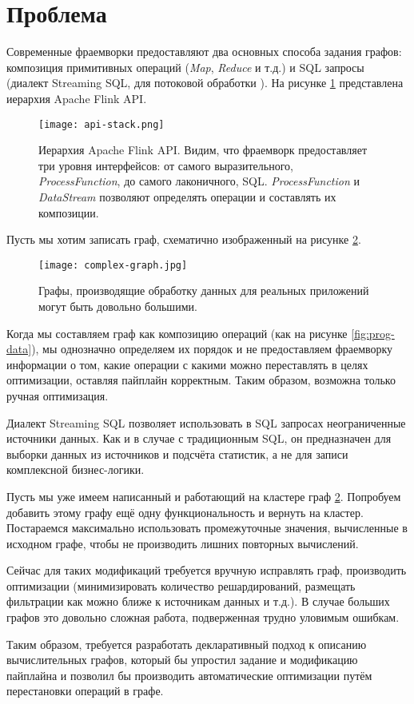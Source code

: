 \section{Проблема}

Современные фраемворки предоставляют два основных способа задания графов: композиция примитивных операций (\textit{Map}, \textit{Reduce} и т.д.) и SQL запросы (диалект Streaming SQL, для потоковой обработки \cite{streaming-sql}). На рисунке \ref{fig:api-stack} представлена иерархия  Apache Flink API.

\begin{figure}[h]
    \texttt{[image: api-stack.png]}
    \caption{Иерархия Apache Flink API. Видим, что фраемворк предоставляет три уровня интерфейсов: от самого выразительного, \textit{ProcessFunction}, до самого лаконичного, SQL. \textit{ProcessFunction} и \textit{DataStream} позволяют определять операции и составлять их композиции.}
    \label{fig:api-stack}
\end{figure}

Пусть мы хотим записать граф, схематично изображенный на рисунке \ref{fig:complex-graph}.

\begin{figure}[h]
    \centering
    \texttt{[image: complex-graph.jpg]}
    \caption{Графы, производящие обработку данных для реальных приложений могут быть довольно большими.}
    \label{fig:complex-graph}
\end{figure}

Когда мы составляем граф как композицию операций (как на рисунке \ref{fig:prog-data}),
мы однозначно определяем их порядок и не предоставляем фраемворку информации о том,
какие операции с какими можно переставлять в целях оптимизации, оставляя пайплайн корректным.
Таким образом, возможна только ручная оптимизация.

Диалект Streaming SQL позволяет использовать в SQL запросах неограниченные источники данных.
Как и в случае с традиционным SQL, он предназначен для выборки данных из источников и подсчёта статистик, а не для записи комплексной бизнес-логики.

Пусть мы уже имеем написанный и работающий на кластере граф \ref{fig:complex-graph}.
Попробуем добавить этому графу ещё одну функциональность и вернуть на кластер.
Постараемся максимально использовать промежуточные значения, вычисленные в исходном графе, чтобы не производить лишних повторных вычислений.

Сейчас для таких модификаций требуется вручную исправлять граф, производить оптимизации (минимизировать количество решардирований, размещать фильтрации как можно ближе к источникам данных и т.д.). В случае больших графов это довольно сложная работа, подверженная трудно уловимым ошибкам.

Таким образом, требуется разработать декларативный подход к описанию вычислительных графов, который бы упростил задание и модификацию пайплайна и позволил бы производить автоматические оптимизации путём перестановки операций в графе.

